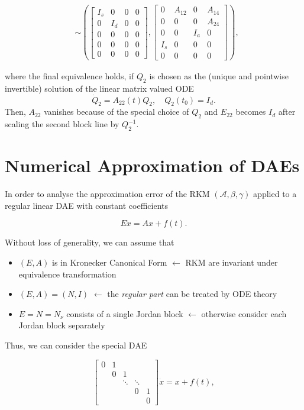 \documentclass[]{book}
\providecommand{\tightlist}{%
  \setlength{\itemsep}{0pt}\setlength{\parskip}{0pt}}
\theoremstyle{definition}
\theoremstyle{definition}
\theoremstyle{definition}
\theoremstyle{remark}
\begin{document}
\begin{align*}
& \sim   
\left(\begin{bmatrix}
I_s & 0 & 0 & 0 \\
0 & I_d & 0 & 0 \\
0 & 0 & 0 & 0 \\
0 & 0 & 0 & 0 \\
0 & 0 & 0 & 0
\end{bmatrix},
\begin{bmatrix}
0 & A_{12} & 0 & A_{14}  \\
0 & 0 & 0 & A_{24}  \\
0 & 0 & I_a & 0 \\
I_s & 0 & 0 & 0 \\
0 & 0 & 0 & 0
\end{bmatrix}\right),
\end{align*}

where the final equivalence holds, if \(Q_2\) is chosen as the (unique
and pointwise invertible) solution of the linear matrix valued ODE \[
\dot Q_2 = A_{22}(t)Q_2 ,  \quad Q_2 (t_0 ) = I_d.
\] Then, \(A_{22}\) vanishes because of the special choice of \(Q_2\)
and \(E_{22}\) becomes \(I_d\) after scaling the second block line by
\(Q_2^{-1}\).

\chapter{Numerical Approximation of
DAEs}\label{numerical-approximation-of-daes}

In order to analyse the approximation error of the RKM
\((\mathcal A, \beta, \gamma)\) applied to a regular linear DAE with
constant coefficients

\[
 E\dot x = Ax+f(t).
\]

Without loss of generality, we can assume that

\begin{itemize}
\tightlist
\item
  \((E,A)\) is in Kronecker Canonical Form \(\leftarrow\) RKM are
  invariant under equivalence transformation
\item
  \((E,A)=(N,I)\) \(\leftarrow\) the \emph{regular part} can be treated
  by ODE theory
\item
  \(E=N=N_\nu\) consists of a single Jordan block \(\leftarrow\)
  otherwise consider each Jordan block separately
\end{itemize}

Thus, we can consider the special DAE

\begin{equation}
\begin{bmatrix}
0 & 1 &        &         &    \\
  & 0 & 1      &         &    \\
  &   & \ddots & \ddots  &    \\
  &   &        & 0       & 1  \\
  &   &        &         & 0 
\end{bmatrix}
\dot x = x + f(t),
\label{eq:spec-dae-rkm-cc}
\end{equation}
\end{document}
